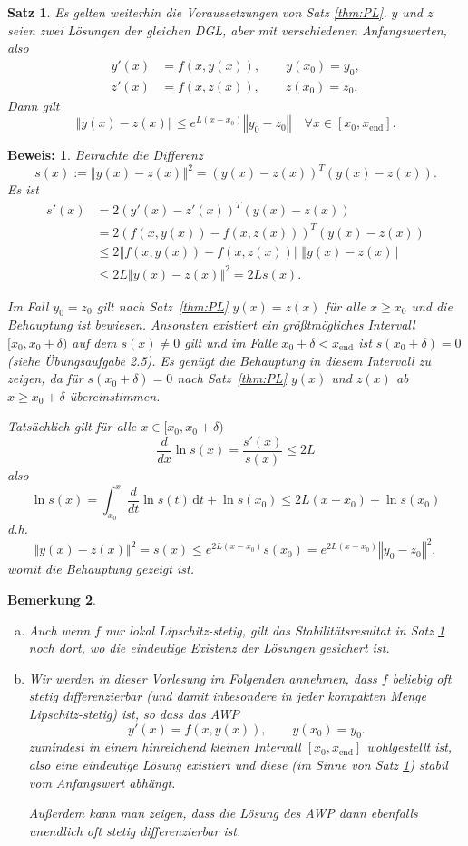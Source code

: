 \documentclass[12pt,a4paper]{book}
\theoremstyle{break}
\newtheorem{theorem}{Satz}[chapter]
\newtheorem{bemerkung}[theorem]{Bemerkung}
\theoremstyle{nonumberplain}
\newtheorem{beweis}{Beweis:}
\newcommand{\norm}[1]{\left\Vert#1\right\Vert}		%
\newcommand{\1}{\mathbbm{1}} 			      	%
\newcommand{\dx}[1][x]{\ensuremath{\, \mathrm{d} #1}} 	%
\begin{document}
\begin{theorem}\label{thm:stability}
Es gelten weiterhin die Voraussetzungen von Satz \ref{thm:PL}.
$y$ und $z$ seien zwei Lösungen der gleichen DGL, aber mit verschiedenen Anfangswerten, also
\begin{align*}
y'(x)&=f(x,y(x)), \qquad y(x_0)=y_0,\\
z'(x)&=f(x,z(x)), \qquad z(x_0)=z_0.
\end{align*}
Dann gilt
\[
\norm{y(x)-z(x)} \leq e^{L (x-x_0)} \norm{y_0-z_0} \quad \forall x\in [x_0,x_\mathrm{end}].
\]
\end{theorem}
\begin{beweis}
Betrachte die Differenz
\[
s(x):=\norm{y(x)-z(x)}^2=(y(x)-z(x))^T (y(x)-z(x)).
\]
Es ist
\begin{align*}
s'(x) &= 2 (y'(x)-z'(x))^T (y(x)-z(x))\\
 &= 2 (f(x,y(x))-f(x,z(x)))^T (y(x)-z(x))\\
&\leq 2 \norm{ f(x,y(x))-f(x,z(x)) }\, \norm{y(x)-z(x)}\\
&\leq 2 L \norm{y(x)-z(x)}^2=2L s(x).
\end{align*}

Im Fall $y_0=z_0$ gilt nach Satz~\ref{thm:PL} $y(x)=z(x)$ für alle $x\geq x_0$ und die Behauptung ist bewiesen. Ansonsten existiert ein größtmögliches Intervall $[x_0,x_0+\delta)$ auf dem 
$s(x)\neq 0$ gilt und im Falle $x_0+\delta<x_\mathrm{end}$ ist $s(x_0+\delta)=0$
(siehe Übungsaufgabe 2.5). Es genügt die Behauptung in diesem Intervall zu zeigen,
da für $s(x_0+\delta)=0$ nach Satz~\ref{thm:PL} $y(x)$ und $z(x)$
ab $x\geq x_0+\delta$ übereinstimmen.

Tatsächlich gilt für alle $x\in [x_0,x_0+\delta)$
\[
\frac{d}{d x} \ln s(x)=\frac{s'(x)}{s(x)}\leq 2L
\]
also
\[
\ln s(x)=\int_{x_0}^x \frac{d}{d t} \ln s(t) \dx[t] + \ln s(x_0) \leq 2L (x-x_0) + \ln s(x_0)
\]
d.h.
\[
\norm{y(x)-z(x)}^2=s(x)\leq e^{2L(x-x_0)} s(x_0)=e^{2L(x-x_0)} \norm{y_0-z_0}^2,
\]
womit die Behauptung gezeigt ist.
\end{beweis}
%

\begin{bemerkung}
\begin{enumerate}[(a)]
\item Auch wenn $f$ nur lokal Lipschitz-stetig, gilt das Stabilitätsresultat in Satz \ref{thm:stability} noch dort, wo die eindeutige Existenz der Lösungen gesichert ist.

\item 
Wir werden in dieser Vorlesung im Folgenden annehmen, dass $f$ beliebig oft stetig differenzierbar (und damit inbesondere in jeder kompakten Menge Lipschitz-stetig) ist, so dass das AWP
\[
y'(x)=f(x,y(x)), \qquad y(x_0)=y_0.
\]
zumindest in einem hinreichend kleinen Intervall $[x_0,x_\mathrm{end}]$ wohlgestellt ist, also 
eine eindeutige Lösung existiert und diese (im Sinne von Satz \ref{thm:stability}) stabil vom
Anfangswert abhängt.

Außerdem kann man zeigen, dass die Lösung des AWP dann ebenfalls unendlich oft stetig 
differenzierbar ist.
\end{enumerate}
\end{bemerkung}
\end{document}
